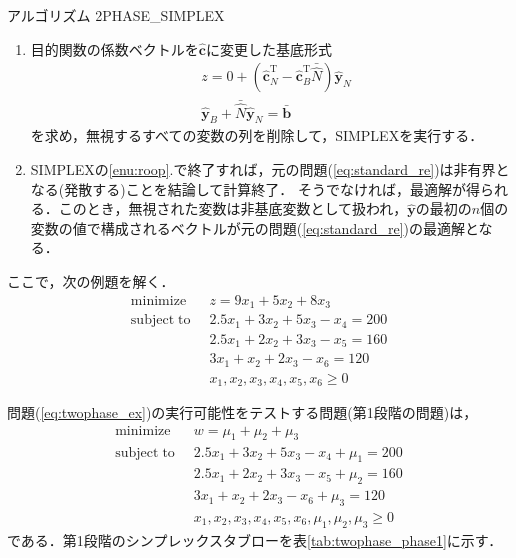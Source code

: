 \documentclass{jsreport}
\begin{document}
\begin{itembox}[l]{アルゴリズム 2PHASE\_SIMPLEX}
\begin{enumerate}
    \item 目的関数の係数ベクトルを$\hat{\bm{c}}$に変更した基底形式
    \begin{align}\label{eq:two_basic_change}
      &z = 0 + (\hat{\bm{c}}_N^{\mathrm{T}} - \hat{\bm{c}}_B^{\mathrm{T}}\bar{\hat{N}}) \hat{\bm{y}}_N \nonumber \\
      &\hat{\bm{y}}_B + \bar{\hat{N}}\hat{\bm{y}}_N = \bar{\bm{b}}
    \end{align}
    を求め，無視するすべての変数の列を削除して，SIMPLEXを実行する．
    \item SIMPLEXの\ref{enu:roop}.で終了すれば，元の問題(\ref{eq:standard_re})は非有界となる(発散する)ことを結論して計算終了．
    そうでなければ，最適解が得られる．このとき，無視された変数は非基底変数として扱われ，$\hat{\bm{y}}$の最初の$n$個の変数の値で構成されるベクトルが元の問題(\ref{eq:standard_re})の最適解となる．
  \end{enumerate}
\end{itembox}

ここで，次の例題を解く．
\begin{align}\label{eq:twophase_ex}
  \mathrm{minimize} \; \; &z = 9x_1 + 5x_2 + 8x_3 \nonumber \\
  \mathrm{subject \; to} \; \; &2.5x_1 + 3x_2 + 5x_3 - x_4 = 200 \nonumber \\
  &2.5x_1 + 2x_2 + 3x_3 - x_5 = 160 \\
  &3x_1 + x_2 + 2x_3 - x_6 = 120 \nonumber \\
  &x_1, x_2, x_3, x_4, x_5, x_6 \geq 0 \nonumber
\end{align}

問題(\ref{eq:twophase_ex})の実行可能性をテストする問題(第1段階の問題)は，
\begin{align}\label{eq:twophase_ex_test}
  \mathrm{minimize} \; \; &w = \mu_1 + \mu_2 + \mu_3 \nonumber \\
  \mathrm{subject \; to} \; \; &2.5x_1 + 3x_2 + 5x_3 - x_4 + \mu_1 = 200 \nonumber \\
  &2.5x_1 + 2x_2 + 3x_3 - x_5 + \mu_2 = 160 \\
  &3x_1 + x_2 + 2x_3 - x_6 + \mu_3 = 120 \nonumber \\
  &x_1, x_2, x_3, x_4, x_5, x_6, \mu_1, \mu_2, \mu_3 \geq 0 \nonumber
\end{align}
である．第1段階のシンプレックスタブローを表\ref{tab:twophase_phase1}に示す．
\end{document}
